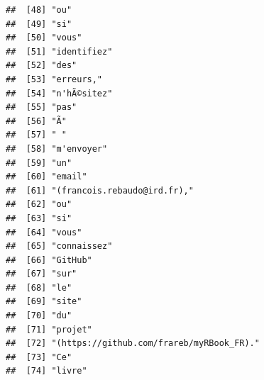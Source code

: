 \documentclass[]{book}
\begin{document}
\begin{verbatim}
##  [48] "ou"                                                                                     
##  [49] "si"                                                                                     
##  [50] "vous"                                                                                   
##  [51] "identifiez"                                                                             
##  [52] "des"                                                                                    
##  [53] "erreurs,"                                                                               
##  [54] "n'hÃ©sitez"                                                                             
##  [55] "pas"                                                                                    
##  [56] "Ã"                                                                                      
##  [57] " "                                                                                      
##  [58] "m'envoyer"                                                                              
##  [59] "un"                                                                                     
##  [60] "email"                                                                                  
##  [61] "(francois.rebaudo@ird.fr),"                                                             
##  [62] "ou"                                                                                     
##  [63] "si"                                                                                     
##  [64] "vous"                                                                                   
##  [65] "connaissez"                                                                             
##  [66] "GitHub"                                                                                 
##  [67] "sur"                                                                                    
##  [68] "le"                                                                                     
##  [69] "site"                                                                                   
##  [70] "du"                                                                                     
##  [71] "projet"                                                                                 
##  [72] "(https://github.com/frareb/myRBook_FR)."                                                
##  [73] "Ce"                                                                                     
##  [74] "livre"                                                                                  

\end{verbatim}
\end{document}
